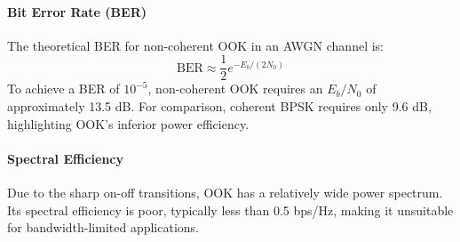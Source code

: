 \paragraph{Bit Error Rate (BER)}
The theoretical BER for non-coherent OOK in an AWGN channel is:
\begin{equation}
    \text{BER} \approx \frac{1}{2}e^{-E_b/(2N_0)}
\end{equation}
To achieve a BER of $10^{-5}$, non-coherent OOK requires an $E_b/N_0$ of approximately 13.5 dB. For comparison, coherent BPSK requires only 9.6 dB, highlighting OOK's inferior power efficiency.

\paragraph{Spectral Efficiency}
Due to the sharp on-off transitions, OOK has a relatively wide power spectrum. Its spectral efficiency is poor, typically less than 0.5 bps/Hz, making it unsuitable for bandwidth-limited applications.


